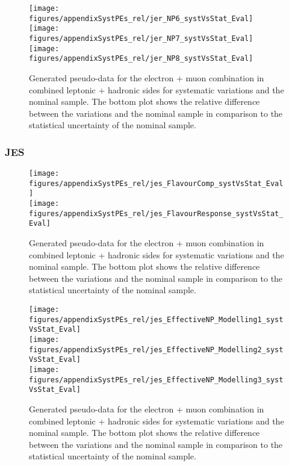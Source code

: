 \begin{figure}[!hb]
\begin{center}
        \texttt{[image: figures/appendixSystPEs\_rel/jer\_NP6\_systVsStat\_Eval]}\\
        \texttt{[image: figures/appendixSystPEs\_rel/jer\_NP7\_systVsStat\_Eval]}\\
        \texttt{[image: figures/appendixSystPEs\_rel/jer\_NP8\_systVsStat\_Eval]}\\
\caption{Generated pseudo-data for the electron + muon combination in combined leptonic + hadronic sides for systematic variations and the nominal \ttbar sample. The bottom plot shows the relative difference between the variations and the nominal sample in comparison to the statistical uncertainty of the nominal sample.}   
\label{fig:systematicVar_lephad_JER_1_4}
\end{center}
\end{figure}


\subsubsection{JES}

\begin{figure}[!hb]
\begin{center}
        \texttt{[image: figures/appendixSystPEs\_rel/jes\_FlavourComp\_systVsStat\_Eval]}\\
        \texttt{[image: figures/appendixSystPEs\_rel/jes\_FlavourResponse\_systVsStat\_Eval]}\\
\caption{Generated pseudo-data for the electron + muon combination in combined leptonic + hadronic sides for systematic variations and the nominal \ttbar sample. The bottom plot shows the relative difference between the variations and the nominal sample in comparison to the statistical uncertainty of the nominal sample.}   
\label{fig:systematicVar_lephad_JES_1_1}
\end{center}
\end{figure}

\begin{figure}[!hb]
\begin{center}
        \texttt{[image: figures/appendixSystPEs\_rel/jes\_EffectiveNP\_Modelling1\_systVsStat\_Eval]}\\
        \texttt{[image: figures/appendixSystPEs\_rel/jes\_EffectiveNP\_Modelling2\_systVsStat\_Eval]}\\
        \texttt{[image: figures/appendixSystPEs\_rel/jes\_EffectiveNP\_Modelling3\_systVsStat\_Eval]}
\caption{Generated pseudo-data for the electron + muon combination in combined leptonic + hadronic sides for systematic variations and the nominal \ttbar sample. The bottom plot shows the relative difference between the variations and the nominal sample in comparison to the statistical uncertainty of the nominal sample.}   
\label{fig:systematicVar_lephad_JES_1_2}
\end{center}
\end{figure}
        
